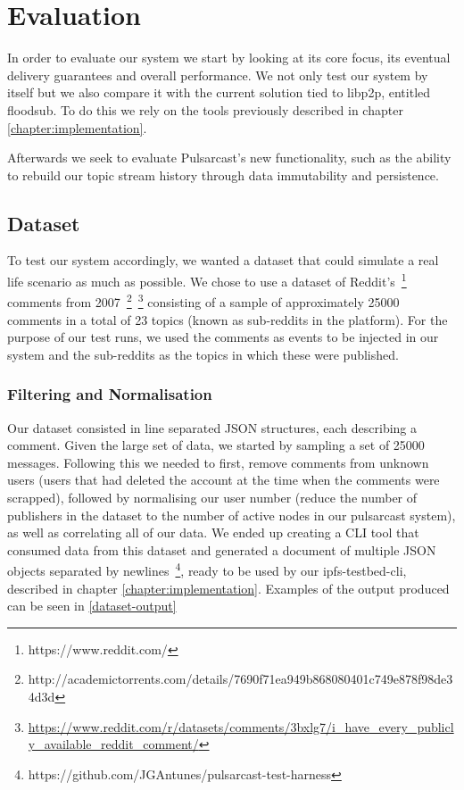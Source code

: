 
\chapter{Evaluation}
\label{chapter:evaluation}

In order to evaluate our system we start by looking at its core focus, its
eventual delivery guarantees and overall performance. We not only test our
system by itself but we also compare it with the current solution tied to
libp2p, entitled floodsub. To do this we rely on the tools previously described
in chapter \ref{chapter:implementation}. 

Afterwards we seek to evaluate  Pulsarcast's new functionality, such as the
ability to rebuild our topic stream history through data immutability and
persistence.

\section{Dataset}\label{dataset}

To test our system accordingly, we wanted a dataset that could simulate a real
life scenario as much as possible. We chose to use a dataset of
Reddit's~\footnote{https://www.reddit.com/} comments from
2007~\footnote{http://academictorrents.com/details/7690f71ea949b868080401c749e878f98de34d3d}~\footnote{\url{https://www.reddit.com/r/datasets/comments/3bxlg7/i_have_every_publicly_available_reddit_comment/}} consisting of a sample of approximately 25000 comments in a total of 23 topics (known as sub-reddits in the platform). For the purpose of our test runs, we used the comments as events to be injected in our system and the sub-reddits as the topics in which these were published.


\subsection{Filtering and Normalisation}\label{subsec:filtering}

Our dataset consisted in line separated JSON structures, each describing a
comment. Given the large set of data, we started by sampling a set of 25000
messages.  Following this we needed to first, remove comments from unknown
users (users that had deleted the account at the time when the comments were
scrapped), followed by normalising our user number (reduce the number of
publishers in the dataset to the number of active nodes in our pulsarcast
system), as well as correlating all of our data. We ended up creating a CLI
tool that consumed data from this dataset and generated a document of multiple
JSON objects separated by
newlines~\footnote{https://github.com/JGAntunes/pulsarcast-test-harness}, ready
to be used by our ipfs-testbed-cli, described in chapter
\ref{chapter:implementation}. Examples of the output produced can be seen in
\ref{dataset-output}

